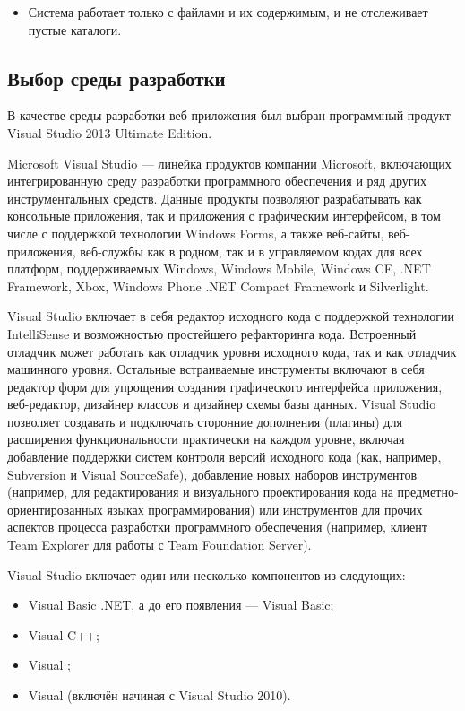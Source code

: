 \begin{itemize}
  \item Система работает только с файлами и их содержимым, и не отслеживает пустые каталоги.
\end{itemize}



\subsection{Выбор среды разработки }
\label{sub:practice:sreda}

В качестве среды разработки веб-приложения был выбран программный продукт Visual Studio 2013 Ultimate Edition. 

Microsoft Visual Studio — линейка продуктов компании Microsoft, включающих интегрированную среду разработки программного обеспечения и ряд других инструментальных средств. Данные продукты позволяют разрабатывать как консольные приложения, так и приложения с графическим интерфейсом, в том числе с поддержкой технологии Windows Forms, а также веб-сайты, веб-приложения, веб-службы как в родном, так и в управляемом кодах для всех платформ, поддерживаемых Windows, Windows Mobile, Windows CE, .NET Framework, Xbox, Windows Phone .NET Compact Framework и Silverlight.

Visual Studio включает в себя редактор исходного кода с поддержкой технологии IntelliSense и возможностью простейшего рефакторинга кода. Встроенный отладчик может работать как отладчик уровня исходного кода, так и как отладчик машинного уровня. Остальные встраиваемые инструменты включают в себя редактор форм для упрощения создания графического интерфейса приложения, веб-редактор, дизайнер классов и дизайнер схемы базы данных. Visual Studio позволяет создавать и подключать сторонние дополнения (плагины) для расширения функциональности практически на каждом уровне, включая добавление поддержки систем контроля версий исходного кода (как, например, Subversion и Visual SourceSafe), добавление новых наборов инструментов (например, для редактирования и визуального проектирования кода на предметно-ориентированных языках программирования) или инструментов для прочих аспектов процесса разработки программного обеспечения (например, клиент Team Explorer для работы с Team Foundation Server).

Visual Studio включает один или несколько компонентов из следующих:
\begin{itemize}
  \item Visual Basic .NET, а до его появления — Visual Basic;
  \item Visual C++;
  \item Visual \csharp{};
  \item Visual \fsharp{}(включён начиная с Visual Studio 2010).
\end{itemize}

